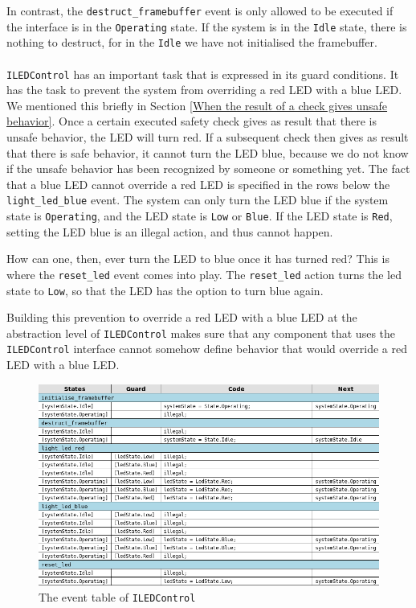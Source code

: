 \documentclass[12pt]{scrreprt}
\begin{document}
In contrast, the \texttt{destruct\_framebuffer} event is only allowed to be executed if the interface is in the \texttt{Operating} state. If the system is in the \texttt{Idle} state, there is nothing to destruct, for in the \texttt{Idle} we have not initialised the framebuffer.
\\\\
\texttt{ILEDControl} has an important task that is expressed in its guard conditions. It has the task to prevent the system from overriding a red LED with a blue LED. We mentioned this briefly in Section \ref{When the result of a check gives unsafe behavior}. Once a certain executed safety check gives as result that there is unsafe behavior, the LED will turn red. If a subsequent check then gives as result that there is safe behavior, it cannot turn the LED blue, because we do not know if the unsafe behavior has been recognized by someone or something yet. The fact that a blue LED cannot override a red LED is specified in the rows below the \texttt{light\_led\_blue} event. The system can only turn the LED blue if the system state is \texttt{Operating}, and the LED state is \texttt{Low} or \texttt{Blue}. If the LED state is \texttt{Red}, setting the LED blue is an illegal action, and thus cannot happen.
\par
How can one, then, ever turn the LED to blue once it has turned red? This is where the \texttt{reset\_led} event comes into play. The \texttt{reset\_led} action turns the led state to \texttt{Low}, so that the LED has the option to turn blue again.
\par
Building this prevention to override a red LED with a blue LED at the abstraction level of \texttt{ILEDControl} makes sure that any component that uses the \texttt{ILEDControl} interface cannot somehow define behavior that would override a red LED with a blue LED.  


\begin{figure}[H]
    \centering
    \includegraphics[width=\textwidth]{Figures/results/modelling_figures/ILEDControl/ILEDControl_event_table.png}
    \caption{The event table of \texttt{ILEDControl}}
    \label{fig:ILEDControl_event_table}
\end{figure}
\end{document}
